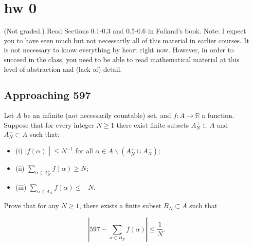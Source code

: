 \chapter{hw 0}\label{hw-0}

(Not graded.) Read Sections 0.1-0.3 and 0.5-0.6 in Folland's book. Note: I expect you to have seen much but not necessarily all of this material in earlier courses. It is not necessary to know everything by heart right now. However, in order to succeed in the class, you need to be able to read mathematical material at this level of abstraction and (lack of) detail.

\section{Approaching 597}\label{approaching-597}

Let \(A\) be an infinite (not necessarily countable) set, and \(f:A\rightarrow\mathbb{R}\) a function. Suppose that for every integer \(N \geq 1\) there exist finite subsets \(A_{N}^{+} \subset A\) and \(A_{N}^{-} \subset A\) such that:

\begin{itemize}
\item
  (i) \(\left. |f(\alpha) \middle| \leq N^{- 1} \right.\) for all \(\alpha \in A\backslash(A_{N}^{+} \cup A_{N}^{-})\);
\item
  (ii) \(\sum_{\alpha \in A_{N}^{+}}f(\alpha) \geq N\);
\item
  (iii) \(\sum_{\alpha \in A_{N}^{-}}f(\alpha) \leq - N\).
\end{itemize}

Prove that for any \(N \geq 1\), there exists a finite subset \(B_{N} \subset A\) such that

\[\left| {597 - \sum\limits_{\alpha \in B_{N}}f(\alpha)} \right| \leq \frac{1}{N}.\]

